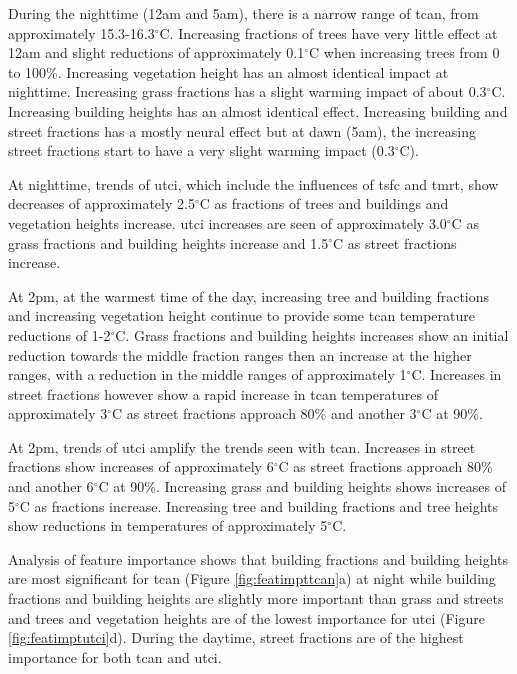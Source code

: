 \documentclass[final,3p,times,authoryear]{elsarticle}
\begin{document}
During the nighttime (12am and 5am), there is a narrow range of \gls{tcan}, from approximately 15.3-16.3$^{\circ}$C. Increasing fractions of trees have very little effect at 12am and slight reductions of approximately 0.1$^{\circ}$C when increasing trees from 0 to 100\%. Increasing vegetation height has an almost identical impact at nighttime. Increasing grass fractions has a slight warming impact of about 0.3$^{\circ}$C. Increasing building heights has an almost identical effect. Increasing building and street fractions has a mostly neural effect but at dawn (5am), the increasing street fractions start to have a very slight warming impact (0.3$^{\circ}$C). 

At nighttime, trends of \gls{utci}, which include the influences of \gls{tsfc} and \gls{tmrt}, show decreases of approximately 2.5$^{\circ}$C as fractions of trees and buildings and vegetation heights increase. \gls{utci} increases are seen of approximately 3.0$^{\circ}$C as grass fractions and building heights increase and 1.5$^{\circ}$C as street fractions increase.

At 2pm, at the warmest time of the day, increasing tree and building fractions and increasing vegetation height continue to provide some \gls{tcan} temperature reductions of 1-2$^{\circ}$C. Grass fractions and building heights increases show an initial reduction towards the middle fraction ranges then an increase at the higher ranges, with a reduction in the middle ranges of approximately 1$^{\circ}$C. Increases in street fractions however show a rapid increase in \gls{tcan} temperatures of approximately 3$^{\circ}$C as street fractions approach 80\% and another 3$^{\circ}$C at 90\%.

At 2pm, trends of \gls{utci} amplify the trends seen with \gls{tcan}. Increases in street fractions show increases of approximately 6$^{\circ}$C as street fractions approach 80\% and another 6$^{\circ}$C at 90\%. Increasing grass and building heights shows increases of 5$^{\circ}$C as fractions increase. Increasing tree and building fractions and tree heights show reductions in temperatures of approximately 5$^{\circ}$C.

Analysis of feature importance shows that building fractions and building heights are most significant for \gls{tcan} (Figure \ref{fig:featimpttcan}a) at night while building fractions and building heights are slightly more important than grass and streets and trees and vegetation heights are of the lowest importance for \gls{utci} (Figure  \ref{fig:featimptutci}d). During the daytime, street fractions are of the highest importance for both \gls{tcan} and \gls{utci}.
\end{document}
